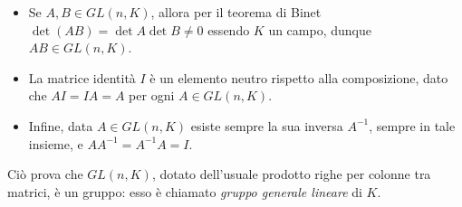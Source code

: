 \begin{itemize}
	\item Se $A,B\in GL(n,K)$, allora per il teorema di Binet $\det(AB)=\det A\det B\ne 0$ essendo $K$ un campo, dunque $AB\in GL(n,K)$.
	\item La matrice identità $I$ è un elemento neutro rispetto alla composizione, dato che $AI=IA=A$ per ogni $A\in GL(n,K)$.
	\item Infine, data $A\in GL(n,K)$ esiste sempre la sua inversa $A^{-1}$, sempre in tale insieme, e $AA^{-1}=A^{-1}A=I$.
\end{itemize}
Ciò prova che $GL(n,K)$, dotato dell'usuale prodotto righe per colonne tra matrici, è un gruppo: esso è chiamato \emph{gruppo generale lineare} di $K$.
